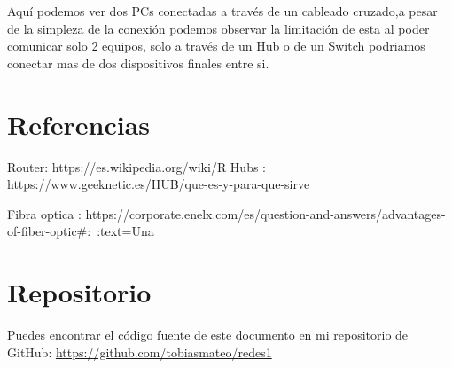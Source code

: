 \documentclass{article}
\begin{document}
Aquí podemos ver dos PCs conectadas a través de un cableado cruzado,a pesar de la simpleza de la conexión podemos observar la limitación de esta al poder comunicar solo 2 equipos, solo a través de un Hub o de un Switch podriamos conectar mas de dos dispositivos finales entre si.

\section*{Referencias}
Router: https://es.wikipedia.org/wiki/R%
Hubs : https://www.geeknetic.es/HUB/que-es-y-para-que-sirve

Fibra optica : https://corporate.enelx.com/es/question-and-answers/advantages-of-fiber-optic#:~:text=Una%

\section*{Repositorio}
Puedes encontrar el código fuente de este documento en mi repositorio de GitHub: \url{https://github.com/tobiasmateo/redes1}



\end{document}
